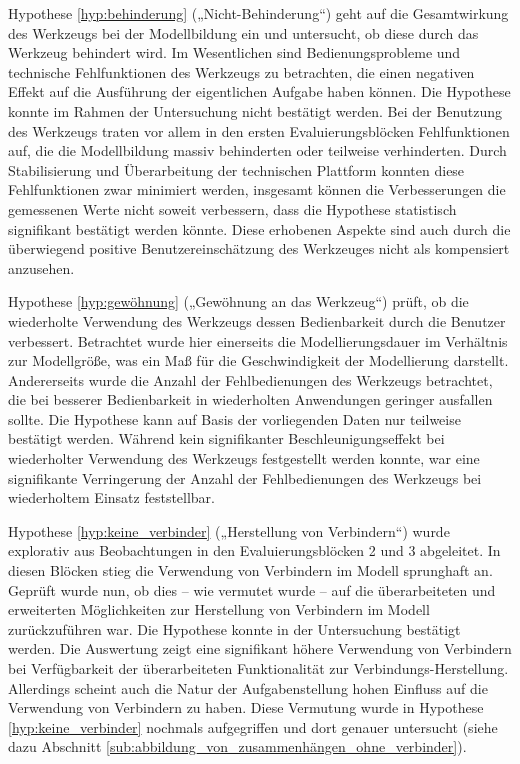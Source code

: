 Hypothese \ref{hyp:behinderung} („Nicht-Behinderung“) geht auf die Gesamtwirkung des Werkzeugs bei der Modellbildung ein und untersucht, ob diese durch das Werkzeug behindert wird. Im Wesentlichen sind Bedienungsprobleme und technische Fehlfunktionen des Werkzeugs zu betrachten, die einen negativen Effekt auf die Ausführung der eigentlichen Aufgabe haben können. Die Hypothese konnte im Rahmen der Untersuchung nicht bestätigt werden. Bei der Benutzung des Werkzeugs traten vor allem in den ersten Evaluierungsblöcken Fehlfunktionen auf, die die Modellbildung massiv behinderten oder teilweise verhinderten. Durch Stabilisierung und Überarbeitung der technischen Plattform konnten diese Fehlfunktionen zwar minimiert werden, insgesamt können die Verbesserungen die gemessenen Werte nicht soweit verbessern, dass die Hypothese statistisch signifikant bestätigt werden könnte. Diese erhobenen Aspekte sind auch durch die überwiegend positive Benutzereinschätzung des Werkzeuges nicht als kompensiert anzusehen.

Hypothese \ref{hyp:gewöhnung} („Gewöhnung an das Werkzeug“) prüft, ob die wiederholte Verwendung des Werkzeugs dessen Bedienbarkeit durch die Benutzer verbessert. Betrachtet wurde hier einerseits die Modellierungsdauer im Verhältnis zur Modellgröße, was ein Maß für die Geschwindigkeit der Modellierung darstellt. Andererseits wurde die Anzahl der Fehlbedienungen des Werkzeugs betrachtet, die bei besserer Bedienbarkeit in wiederholten Anwendungen geringer ausfallen sollte. Die Hypothese kann auf Basis der vorliegenden Daten nur teilweise bestätigt werden. Während kein signifikanter Beschleunigungseffekt bei wiederholter Verwendung des Werkzeugs festgestellt werden konnte, war eine signifikante Verringerung der Anzahl der Fehlbedienungen des Werkzeugs bei wiederholtem Einsatz feststellbar.

Hypothese \ref{hyp:keine_verbinder} („Herstellung von Verbindern“) wurde explorativ aus Beobachtungen in den Evaluierungsblöcken 2 und 3 abgeleitet. In diesen Blöcken stieg die Verwendung von Verbindern im Modell sprunghaft an. Geprüft wurde nun, ob dies -- wie vermutet wurde -- auf die überarbeiteten und erweiterten Möglichkeiten zur Herstellung von Verbindern im Modell zurückzuführen war. Die Hypothese konnte in der Untersuchung bestätigt werden. Die Auswertung zeigt eine signifikant höhere Verwendung von Verbindern bei Verfügbarkeit der überarbeiteten Funktionalität zur Verbindungs-Herstellung. Allerdings scheint auch die Natur der Aufgabenstellung hohen Einfluss auf die Verwendung von Verbindern zu haben. Diese Vermutung wurde in Hypothese \ref{hyp:keine_verbinder} nochmals aufgegriffen und dort genauer untersucht (siehe dazu  Abschnitt \ref{sub:abbildung_von_zusammenhängen_ohne_verbinder}).

